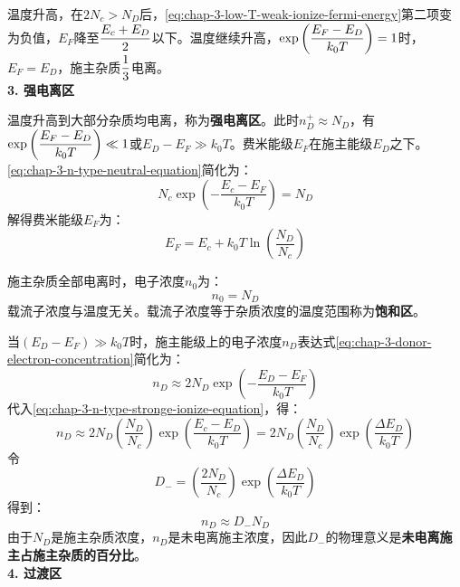 \vspace{1ex}温度升高，在$2N_c>N_D$后，\autoref{eq:chap-3-low-T-weak-ionize-fermi-energy}第二项变为负值，$E_F$降至$\displaystyle \frac{E_c+E_D}{2}$以下。温度继续升高，$\displaystyle \exp{\left(\frac{E_F-E_D}{k_0T}\right)}=1$时，$E_F=E_D$，施主杂质$\displaystyle \frac{1}{3}$电离。\vspace{1ex} \\
\textbf{3. 强电离区}\vspace{1ex}

\vspace{1ex}温度升高到大部分杂质均电离，称为\textbf{强电离区}。此时$n_D^+\approx N_D$，有$\displaystyle \exp{\left(\frac{E_F-E_D}{k_0T}\right)}\ll 1$或$E_D-E_F\gg k_0T$。费米能级$E_F$在施主能级$E_D$之下。\autoref{eq:chap-3-n-type-neutral-equation}简化为：
\begin{equation}
    N_c\exp{\left(-\frac{E_c-E_F}{k_0T}\right)}=N_D\label{eq:chap-3-n-type-stronge-ionize-equation}
\end{equation}
解得费米能级$E_F$为：
\begin{equation}
    E_F=E_c+k_0T\ln{\left(\frac{N_D}{N_c}\right)}\label{eq:chap-3-n-type-stronge-ionize-fermi-energy}
\end{equation}

施主杂质全部电离时，电子浓度$n_0$为：
\begin{equation}
    n_0=N_D
\end{equation}
载流子浓度与温度无关。载流子浓度等于杂质浓度的温度范围称为\textbf{饱和区}。

当$(E_D-E_F)\gg k_0T$时，施主能级上的电子浓度$n_D$表达式\autoref{eq:chap-3-donor-electron-concentration}简化为：
\begin{equation}
    n_D\approx 2N_D\exp{\left(-\frac{E_D-E_F}{k_0T}\right)}
\end{equation}
代入\autoref{eq:chap-3-n-type-stronge-ionize-equation}，得：
\begin{equation}
    n_D\approx 2N_D\left(\frac{N_D}{N_c}\right)\exp{\left(\frac{E_c-E_D}{k_0T}\right)}=2N_D\left(\frac{N_D}{N_c}\right)\exp{\left(\frac{\Delta E_D}{k_0T}\right)}
\end{equation}
令
\begin{equation}
    D_-=\left(\frac{2N_D}{N_c}\right)\exp{\left(\frac{\Delta E_D}{k_0T}\right)}
\end{equation}
得到：
\begin{equation}
    n_D\approx D_-N_D
\end{equation}
由于$N_D$是施主杂质浓度，$n_D$是未电离施主浓度，因此$D_-$的物理意义是\textbf{未电离施主占施主杂质的百分比}。\vspace{1ex}\\
\textbf{4. 过渡区}\vspace{1ex}

